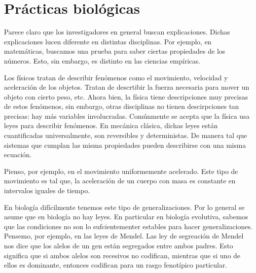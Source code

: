 



\chapter{Prácticas biológicas}
\label{ch:practices}

Parece claro que los investigadores en general buscan explicaciones.
Dichas explicaciones lucen diferente en distintas disciplinas.
Por ejemplo, en matemáticas, buscamos una prueba para saber ciertas propiedades de los números.
Esto, sin embargo, es distinto en las ciencias empíricas.

Los físicos tratan de describir fenómenos como el movimiento, velocidad y aceleración de los objetos.
Tratan de descrtibir la fuerza necesaria para mover un objeto con cierto peso, etc.
Ahora bien, la física tiene descripciones muy precisas de estos fenómenos, sin embargo, otras disciplinas no tienen descirpciones tan precisas: hay más variables involucradas.
Comúnmente se acepta que la física usa leyes para describir fenómenos.
En mecánica clásica, dichas leyes están cuantificadas universalmente, son reversibles y deterministas.
De manera tal que sistemas que cumplan las misma propiedades pueden describirse con una misma ecuación.

Pienso, por ejemplo, en el movimiento uniformemente acelerado.
Este tipo de movimiento es tal que, la aceleración de un cuerpo con masa es constante en intervalos iguales de tiempo. 

En biología difícilmente tenemos este tipo de generalizaciones.
Por lo general se asume que en biología no hay leyes. 
En particular en biología evolutiva, sabemos que las condiciones no son lo sufcientementer estables para hacer generalizaciones.
Pensemo, por ejemplo, en las leyes de Mendel. 
Las ley de segreación de Mendel nos dice que los alelos de un gen están segregados entre ambos padres.
Esto significa que si ambos alelos son recesivos no codifican, mientras que si uno de ellos es dominante, entonces codifican para un rasgo fenotípico particular.





